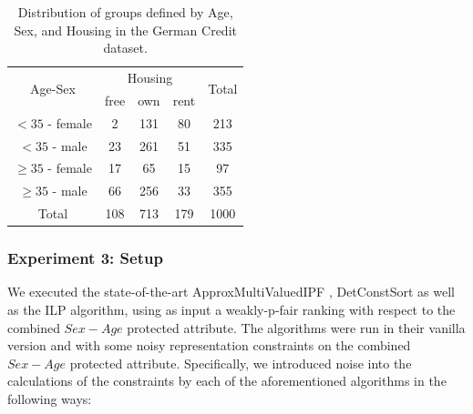 \begin{table}[h]
  \centering
\begin{tabular}{ccccc}
\hline
\multicolumn{1}{c}{\multirow{2}{*}{Age-Sex}} & \multicolumn{3}{c}{Housing}                                                     & \multicolumn{1}{l}{\multirow{2}{*}{Total}} \\ \cline{2-4}
\multicolumn{1}{c}{}                         & \multicolumn{1}{l}{free} & \multicolumn{1}{l}{own} & \multicolumn{1}{l}{rent} & \multicolumn{1}{l}{}                       \\ \hline
$<35$ - female                                 & 2                         & 131                      & 80                        & 213                                         \\
$<35$ - male                                   & 23                        & 261                      & 51                        & 335                                         \\
$\geq 35$ - female                             & 17                        & 65                       & 15                        & 97                                          \\
$\geq 35$ - male                               & 66                        & 256                      & 33                        & 355                                         \\ \hline
Total                                          & 108                       & 713                      & 179                       & 1000 \\ \hline                                       
\end{tabular}
   \caption{Distribution of groups defined by Age, Sex, and Housing in the German Credit dataset.}
    \label{tab:german_groups}
\end{table}

\subsubsection{Experiment 3: Setup}

We executed the state-of-the-art ApproxMultiValuedIPF \cite{RAPF}, DetConstSort \cite{linkedin} as well as the ILP algorithm, using as input a weakly-p-fair ranking with respect to the combined $Sex-Age$ protected attribute. The algorithms were run in their vanilla version and with some noisy representation constraints on the combined $Sex-Age$ protected attribute. 
Specifically, we introduced noise into the calculations of the constraints by each of the aforementioned algorithms in the following ways:

